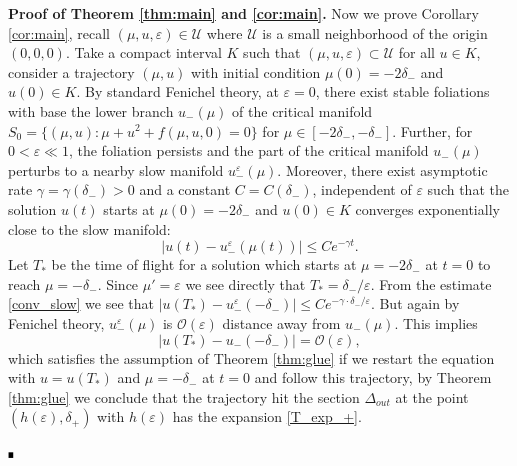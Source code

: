 \documentclass[letterpaper,11pt]{article}
\newcommand{\rmO}{\mathcal{O}}
\newcommand{\eps}{\varepsilon}
\numberwithin{equation}{section}
\theoremstyle{plain}
\newenvironment{Proof}[1][.]%
 {\begin{trivlist}\item[]\textbf{Proof#1 }}%
 {\hspace*{\fill}$\rule{0.3\baselineskip}{0.35\baselineskip}$\end{trivlist}}
\begin{document}
\begin{Proof}[\textbf{ of Theorem \ref{thm:main} and \ref{cor:main}}.]
Now we prove Corollary \ref{cor:main}, recall $(\mu,u,\eps) \in \mathcal{U}$ where $\mathcal{U}$ is a small neighborhood of the origin $(0,0,0)$. Take a compact interval $K$ such that $(\mu, u, \eps) \subset \mathcal{U}$ for all $u \in K$, consider a trajectory $(\mu, u)$ with initial condition $\mu(0) = -2\delta_-$ and $u(0) \in K$. By standard Fenichel theory, at $\eps = 0$, there exist stable foliations with base the lower branch $u_-(\mu)$ of  the critical manifold $S_0=\{ (\mu, u) : \mu+u^2 + f(\mu, u,0) =0 \}$ for $\mu \in [-2\delta_-, -\delta_-]$. Further, for $0<\eps \ll 1$, the foliation persists and the part of the critical manifold $u_-(\mu)$ perturbs to a nearby slow manifold $u_-^{\eps}(\mu)$. Moreover, there exist asymptotic rate $\gamma = \gamma(\delta_-)>0$ and a constant $C=C(\delta_-)$, independent of $\eps$ such that the solution $u(t)$ starts at $\mu(0)=-2\delta_-$ and $u(0) \in K$ converges exponentially close to the slow manifold:
\begin{equation}\label{conv_slow}
|u(t) - u_-^{\eps}(\mu(t))| \le Ce^{-\gamma t}.
\end{equation}
Let $T_*$ be the time of flight for a solution which starts at $\mu = -2\delta_-$ at $t=0$ to reach $\mu  = -\delta_-$. Since $\mu' = \eps$ we see directly that $T_* = \delta_-/\eps$. From the estimate \eqref{conv_slow} we see that $|u(T_*) - u_-^{\eps}(-\delta_-)| \le Ce^{-\gamma \cdot\delta_-/\eps}$. But again by Fenichel theory, $u_-^\eps(\mu)$ is $\rmO(\eps)$ distance away from $u_-(\mu)$. This implies
\[
|u(T_*) - u_-(-\delta_-) |  = \rmO(\eps),
\]
which satisfies the assumption of Theorem \ref{thm:glue} if we restart the equation with $u=u(T_*)$ and $\mu = -\delta_-$ at $t = 0$ and follow this trajectory, by Theorem \ref{thm:glue} we conclude that the trajectory hit the section $\Delta_{out}$ at the point $(h(\eps), \delta_+)$ with $h(\eps)$ has the expansion \eqref{T_exp_+}.


\end{Proof}
\end{document}
